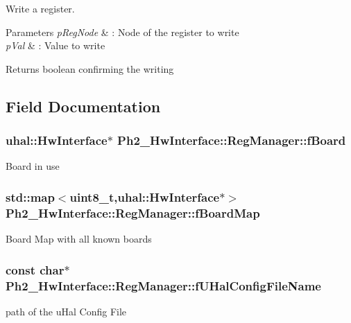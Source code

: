 Write a register. 


\begin{DoxyParams}{Parameters}
{\em p\-Reg\-Node} & \-: Node of the register to write \\
\hline
{\em p\-Val} & \-: Value to write \\
\hline
\end{DoxyParams}
\begin{DoxyReturn}{Returns}
boolean confirming the writing 
\end{DoxyReturn}


\subsection{Field Documentation}
\hypertarget{class_ph2___hw_interface_1_1_reg_manager_a0d4908ec834a3a0b7d8139872fd0a4a0}{
\subsubsection[{f\-Board}]{\setlength{\rightskip}{0pt plus 5cm}uhal\-::\-Hw\-Interface$\ast$ Ph2\-\_\-\-Hw\-Interface\-::\-Reg\-Manager\-::f\-Board\hspace{0.3cm}{\ttfamily [protected]}}}\label{class_ph2___hw_interface_1_1_reg_manager_a0d4908ec834a3a0b7d8139872fd0a4a0}
Board in use \hypertarget{class_ph2___hw_interface_1_1_reg_manager_a9c34ffe467a572796c05036533bb6d39}{
\subsubsection[{f\-Board\-Map}]{\setlength{\rightskip}{0pt plus 5cm}std\-::map$<$uint8\-\_\-t,uhal\-::\-Hw\-Interface$\ast$$>$ Ph2\-\_\-\-Hw\-Interface\-::\-Reg\-Manager\-::f\-Board\-Map\hspace{0.3cm}{\ttfamily [protected]}}}\label{class_ph2___hw_interface_1_1_reg_manager_a9c34ffe467a572796c05036533bb6d39}
Board Map with all known boards \hypertarget{class_ph2___hw_interface_1_1_reg_manager_aaaa29ca65c283acc645132c7bef0f24f}{
\subsubsection[{f\-U\-Hal\-Config\-File\-Name}]{\setlength{\rightskip}{0pt plus 5cm}const char$\ast$ Ph2\-\_\-\-Hw\-Interface\-::\-Reg\-Manager\-::f\-U\-Hal\-Config\-File\-Name\hspace{0.3cm}{\ttfamily [protected]}}}\label{class_ph2___hw_interface_1_1_reg_manager_aaaa29ca65c283acc645132c7bef0f24f}
path of the u\-Hal Config File 

